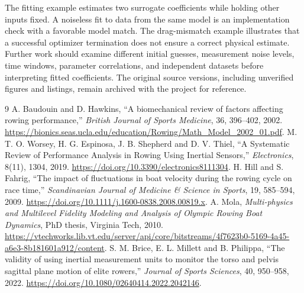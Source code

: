 \documentclass[11pt]{article}
\begin{document}
The fitting example estimates two surrogate coefficients while holding other inputs fixed. A noiseless fit to data from the same model is an implementation check with a favorable model match. The drag-mismatch example illustrates that a successful optimizer termination does not ensure a correct physical estimate. Further work should examine different initial guesses, measurement noise levels, time windows, parameter correlations, and independent datasets before interpreting fitted coefficients. The original source versions, including unverified figures and listings, remain archived with the project for reference.

\begin{thebibliography}{9}
 A. Baudouin and D. Hawkins, ``A biomechanical review of factors affecting rowing performance,'' \emph{British Journal of Sports Medicine}, 36, 396--402, 2002. \url{https://bionics.seas.ucla.edu/education/Rowing/Math_Model_2002_01.pdf}.
 M. T. O. Worsey, H. G. Espinosa, J. B. Shepherd and D. V. Thiel, ``A Systematic Review of Performance Analysis in Rowing Using Inertial Sensors,'' \emph{Electronics}, 8(11), 1304, 2019. \url{https://doi.org/10.3390/electronics8111304}.
 H. Hill and S. Fahrig, ``The impact of fluctuations in boat velocity during the rowing cycle on race time,'' \emph{Scandinavian Journal of Medicine \& Science in Sports}, 19, 585--594, 2009. \url{https://doi.org/10.1111/j.1600-0838.2008.00819.x}.
 A. Mola, \emph{Multi-physics and Multilevel Fidelity Modeling and Analysis of Olympic Rowing Boat Dynamics}, PhD thesis, Virginia Tech, 2010. \url{https://vtechworks.lib.vt.edu/server/api/core/bitstreams/4f7623b0-5169-4a45-a6e3-8b181601a912/content}.
 S. M. Brice, E. L. Millett and B. Philippa, ``The validity of using inertial measurement units to monitor the torso and pelvis sagittal plane motion of elite rowers,'' \emph{Journal of Sports Sciences}, 40, 950--958, 2022. \url{https://doi.org/10.1080/02640414.2022.2042146}.
\end{thebibliography}
\end{document}
